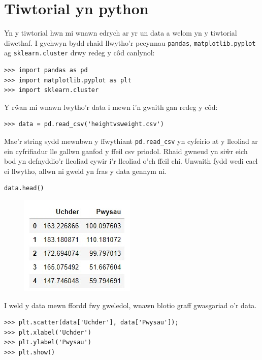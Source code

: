 \section{Tiwtorial yn python}
Yn y tiwtorial hwn mi wnawn edrych ar yr un data a welom yn y tiwtorial diwethaf.
I gychwyn bydd rhaid llwytho'r pecynnau \texttt{pandas}, \texttt{matplotlib.pyplot} ag \texttt{sklearn.cluster} drwy redeg y c\^{o}d canlynol:

\begin{verbatim}
>>> import pandas as pd
>>> import matplotlib.pyplot as plt
>>> import sklearn.cluster
\end{verbatim}

Y r\^{w}an mi wnawn lwytho'r data i mewn i'n gwaith gan redeg y c\^{o}d:

\begin{verbatim}
>>> data = pd.read_csv('heightvsweight.csv')
\end{verbatim}

Mae'r string sydd mewnbwn y ffwythiant \texttt{pd.read_csv} yn cyfeirio at y lleoliad ar ein cyfrifiadur lle gallwn ganfod y ffeil csv priodol. Rhaid gwneud yn si\^{w}r eich bod yn defnyddio'r lleoliad cywir i'r lleoliad o'ch ffeil chi.
Unwaith fydd wedi cael ei llwytho, allwn ni gweld yn fras y data gennym ni. 

\begin{verbatim}
data.head()
\end{verbatim}

\begin{figure}[H]
\begin{center}
\includegraphics[width=0.35\linewidth]{../img/tabl1.jpg}
\end{center}
\label{fig:Data1}
\end{figure}

I weld y data mewn ffordd fwy gweledol, wnawn blotio graff gwasgariad o'r data.

\begin{verbatim}
>>> plt.scatter(data['Uchder'], data['Pwysau']);
>>> plt.xlabel('Uchder')
>>> plt.ylabel('Pwysau')
>>> plt.show()
\end{verbatim}


